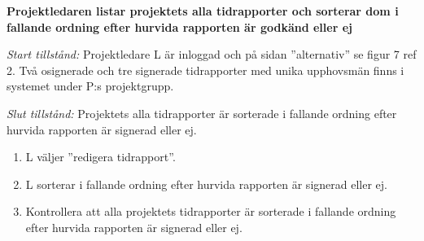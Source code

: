 \documentclass[a4paper]{article}
\begin{document}
\begin{FT}
\item %
\textbf{Projektledaren listar projektets alla tidrapporter och sorterar dom i fallande ordning efter hurvida rapporten är godkänd eller ej}

\emph{Start tillstånd:} Projektledare L är inloggad och på sidan ''alternativ'' se figur 7 ref 2. Två osignerade och tre signerade tidrapporter med unika upphovsmän finns i systemet under P:s projektgrupp.

\emph{Slut tillstånd:} Projektets alla tidrapporter är sorterade i fallande ordning efter hurvida rapporten är signerad eller ej.

\begin{enumerate}
\item L väljer ''redigera tidrapport''.
\item L sorterar i fallande ordning efter hurvida rapporten är signerad eller ej.
\item Kontrollera att alla projektets tidrapporter är sorterade i fallande ordning efter hurvida rapporten är signerad eller ej.
\end{enumerate}

\end{FT}
\end{document}

